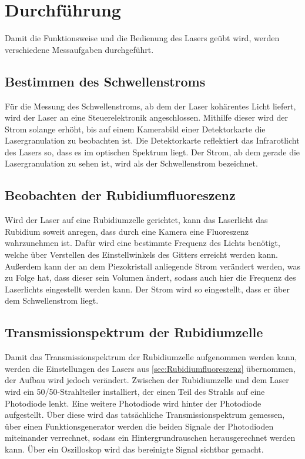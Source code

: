\section{Durchführung}
\label{sec:Durchführung}
Damit die Funktionsweise und die Bedienung des Lasers geübt wird, werden verschiedene Messaufgaben durchgeführt.


\subsection{Bestimmen des Schwellenstroms}
Für die Messung des Schwellenstroms, ab dem der Laser kohärentes Licht liefert, wird der Laser an eine Steuerelektronik angeschlossen. Mithilfe
dieser wird der Strom solange erhöht, bis auf einem Kamerabild einer Detektorkarte die Lasergranulation zu beobachten ist. Die Detektorkarte reflektiert das Infrarotlicht
des Lasers so, dass es im optischen Spektrum liegt. Der Strom, ab dem gerade die Lasergranulation zu sehen ist, wird als der Schwellenstrom bezeichnet.


\subsection{Beobachten der Rubidiumfluoreszenz}
Wird der Laser auf eine Rubidiumzelle gerichtet, kann das Laserlicht das Rubidium soweit anregen, dass durch eine Kamera eine Fluoreszenz wahrzunehmen ist.
Dafür wird eine bestimmte Frequenz des Lichts benötigt, welche über Verstellen des Einstellwinkels des Gitters erreicht werden kann. Außerdem kann der an dem
Piezokristall anliegende Strom verändert werden, was zu Folge hat, dass dieser sein Volumen ändert, sodass auch hier die Frequenz des Laserlichts eingestellt
werden kann. Der Strom wird so eingestellt, dass er über dem Schwellenstrom liegt.


\subsection{Transmissionspektrum der Rubidiumzelle}
Damit das Transmissionspektrum der Rubidiumzelle aufgenommen werden kann, werden die Einstellungen des Lasers aus \ref{sec:Rubidiumfluoreszenz} übernommen, der
Aufbau wird jedoch verändert. Zwischen der Rubidiumzelle und dem Laser wird ein 50/50-Strahlteiler installiert, der einen Teil des Strahls auf eine Photodiode lenkt.
Eine weitere Photodiode wird hinter der Photodiode aufgestellt. Über diese wird das tatsächliche Transmissionspektrum gemessen, über einen Funktionsgenerator werden
die beiden Signale der Photodioden miteinander verrechnet, sodass ein Hintergrundrauschen herausgerechnet werden kann. Über ein Oszilloskop wird das bereinigte Signal
sichtbar gemacht.

